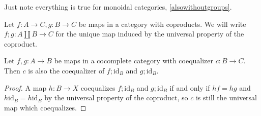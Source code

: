 \documentclass{amsbook} %
\newcommand{\id}{\textrm{id}}
\newenvironment{eq*}{\begin{equation*}}{\end{equation*}}
\numberwithin{section}{chapter}
\begin{document}
%
%

Just note everything is true for monoidal categories, \cref{alsowithoutgroups}.

\begin{nota}\label{plus_notation}
Let $f: A \to C, g: B \to C$ be maps in a category with coproducts. We will write $f;g: A \coprod B \to C$ for the unique map induced by the universal property of the coproduct.
\end{nota}

\begin{lem}\label{sum_coeq}
Let $f, g: A \to B$ be maps in a cocomplete category with coequalizer $c: B \to C$. Then $c$ is also the coequalizer of $f;\id_B$ and $g; \id_B$.
\end{lem}
\begin{proof}
A map $h: B \to X$ coequalizes $f;\id_B$ and $g; \id_B$ if and only if $hf = hg$ and $h \id_B = h \id_B$ by the universal property of the coproduct, so $c$ is still the universal map which coequalizes.

\end{proof}
\end{document}
